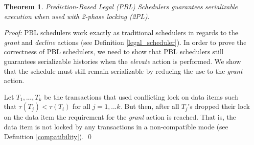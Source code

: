 \documentclass[conference]{IEEEtran}
\newtheorem{theorem}{Theorem}
\begin{document}

\begin{theorem}
\label{theorem1}
Prediction-Based Legal (PBL) Schedulers guarantees serializable execution when used with 2-phase locking (2PL).
\end{theorem}

\textit{Proof:} PBL schedulers work exactly as traditional schedulers in regards to the \textit{grant} and \textit{decline} actions (see Definition \ref{legal_scheduler}). In order to prove the correctness of PBL schedulers, we need to show that PBL schedulers still guarantees serializable histories when the \textit{elevate} action is performed. We show that the schedule must still remain serializable by reducing the use to the \textit{grant} action.

Let $T_{1},...,T_{k}$ be the transactions that used conflicting lock on data items such that $\tau(T_{j}) < \tau(T_{i})$ for all $j=1,...k$. But then, after all $T_{j}$'s dropped their lock on the data item the requirement for the \textit{grant} action is reached. That is, the data item is not locked by any transactions in a non-compatible mode (see Definition \ref{compatibility}). \qed
\end{document}
